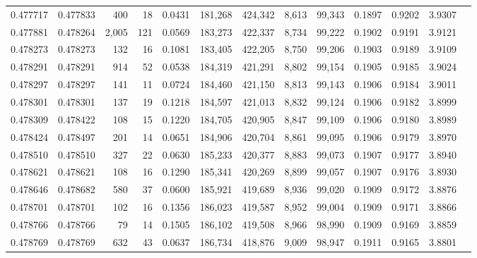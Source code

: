 \begin{tabular}{rrrrrrrrrrrrr}
0.477717 & 0.477833 &   400 &    18 &                                     0.0431 & 181,268 & 424,342 &   8,613 &  99,343 & 0.1897 & 0.9202 & 3.9307 \\
0.477881 & 0.478264 & 2,005 &   121 &                                     0.0569 & 183,273 & 422,337 &   8,734 &  99,222 & 0.1902 & 0.9191 & 3.9121 \\
0.478273 & 0.478273 &   132 &    16 &                                     0.1081 & 183,405 & 422,205 &   8,750 &  99,206 & 0.1903 & 0.9189 & 3.9109 \\
0.478291 & 0.478291 &   914 &    52 &                                     0.0538 & 184,319 & 421,291 &   8,802 &  99,154 & 0.1905 & 0.9185 & 3.9024 \\
0.478297 & 0.478297 &   141 &    11 &                                     0.0724 & 184,460 & 421,150 &   8,813 &  99,143 & 0.1906 & 0.9184 & 3.9011 \\
0.478301 & 0.478301 &   137 &    19 &                                     0.1218 & 184,597 & 421,013 &   8,832 &  99,124 & 0.1906 & 0.9182 & 3.8999 \\
0.478309 & 0.478422 &   108 &    15 &                                     0.1220 & 184,705 & 420,905 &   8,847 &  99,109 & 0.1906 & 0.9180 & 3.8989 \\
0.478424 & 0.478497 &   201 &    14 &                                     0.0651 & 184,906 & 420,704 &   8,861 &  99,095 & 0.1906 & 0.9179 & 3.8970 \\
0.478510 & 0.478510 &   327 &    22 &                                     0.0630 & 185,233 & 420,377 &   8,883 &  99,073 & 0.1907 & 0.9177 & 3.8940 \\
0.478621 & 0.478621 &   108 &    16 &                                     0.1290 & 185,341 & 420,269 &   8,899 &  99,057 & 0.1907 & 0.9176 & 3.8930 \\
0.478646 & 0.478682 &   580 &    37 &                                     0.0600 & 185,921 & 419,689 &   8,936 &  99,020 & 0.1909 & 0.9172 & 3.8876 \\
0.478701 & 0.478701 &   102 &    16 &                                     0.1356 & 186,023 & 419,587 &   8,952 &  99,004 & 0.1909 & 0.9171 & 3.8866 \\
0.478766 & 0.478766 &    79 &    14 &                                     0.1505 & 186,102 & 419,508 &   8,966 &  98,990 & 0.1909 & 0.9169 & 3.8859 \\
0.478769 & 0.478769 &   632 &    43 &                                     0.0637 & 186,734 & 418,876 &   9,009 &  98,947 & 0.1911 & 0.9165 & 3.8801 \\

\end{tabular}
